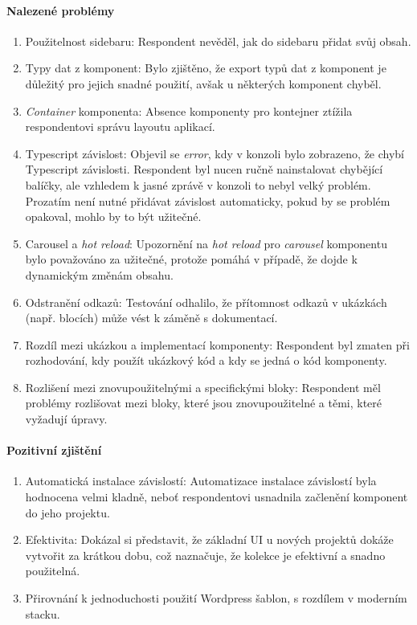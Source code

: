 \paragraph{Nalezené problémy}
\begin{enumerate}
  \item Použitelnost sidebaru: Respondent nevěděl, jak do sidebaru přidat svůj obsah.
  \item Typy dat z komponent: Bylo zjištěno, že export typů dat z komponent je důležitý pro jejich snadné použití, avšak u některých komponent chyběl.
  \item \emph{Container} komponenta: Absence komponenty pro kontejner ztížila respondentovi správu layoutu aplikací.
  \item Typescript závislost: Objevil se \emph{error}, kdy v konzoli bylo zobrazeno, že chybí Typescript závislosti. Respondent byl nucen ručně nainstalovat chybějící balíčky, ale vzhledem k jasné zprávě v konzoli to nebyl velký problém. Prozatím není nutné přidávat závislost automaticky, pokud by se problém opakoval, mohlo by to být užitečné.
  \item Carousel a \emph{hot reload}: Upozornění na \emph{hot reload} pro \emph{carousel} komponentu bylo považováno za užitečné, protože pomáhá v případě, že dojde k dynamickým změnám obsahu.
  \item Odstranění odkazů: Testování odhalilo, že přítomnost odkazů v ukázkách (např. blocích) může vést k záměně s dokumentací.
  \item Rozdíl mezi ukázkou a implementací komponenty: Respondent byl zmaten při rozhodování, kdy použít ukázkový kód a kdy se jedná o kód komponenty.
  \item Rozlišení mezi znovupoužitelnými a specifickými bloky: Respondent měl problémy rozlišovat mezi bloky, které jsou znovupoužitelné a těmi, které vyžadují úpravy.
\end{enumerate}

\paragraph{Pozitivní zjištění}
\begin{enumerate}
  \item Automatická instalace závislostí: Automatizace instalace závislostí byla hodnocena velmi kladně, neboť respondentovi usnadnila začlenění komponent do jeho projektu.
  \item Efektivita: Dokázal si představit, že základní UI u nových projektů dokáže vytvořit za krátkou dobu, což naznačuje, že kolekce je efektivní a snadno použitelná.
  \item Přirovnání k jednoduchosti použití Wordpress šablon, s rozdílem v moderním stacku.
\end{enumerate}


